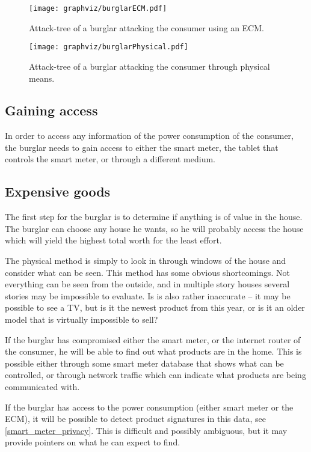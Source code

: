 \begin{figure}
\center
\texttt{[image: graphviz/burglarECM.pdf]}
\caption{Attack-tree of a burglar attacking the consumer using an ECM.}
\label{attacktree:burglar:ecm}
\end{figure}

\begin{figure}
\center
\texttt{[image: graphviz/burglarPhysical.pdf]}
\caption{Attack-tree of a burglar attacking the consumer through physical means.}
\label{attacktree:burglar:physical}
\end{figure}

\subsection{Gaining access}
In order to access any information of the power consumption of the consumer, the burglar needs to gain access to either the smart meter, the tablet that controls the smart meter, or through a different medium.

\subsection{Expensive goods}
The first step for the burglar is to determine if anything is of value in the house. 
The burglar can choose any house he wants, so he will probably access the house which will yield the highest total worth for the least effort.

The physical method is simply to look in through windows of the house and consider what can be seen. 
This method has some obvious shortcomings.
Not everything can be seen from the outside, and in multiple story houses several stories may be impossible to evaluate.
Is is also rather inaccurate -- it may be possible to see a TV, but is it the newest product from this year, or is it an older model that is virtually impossible to sell?

If the burglar has compromised either the smart meter, or the internet router of the consumer, he will be able to find out what products are in the home. 
This is possible either through some smart meter database that shows what can be controlled, or through network traffic which can indicate what products are being communicated with.

If the burglar has access to the power consumption (either smart meter or the ECM), it will be possible to detect product signatures in this data, see \cref{smart_meter_privacy}.
This is difficult and possibly ambiguous, but it may provide pointers on what he can expect to find.

